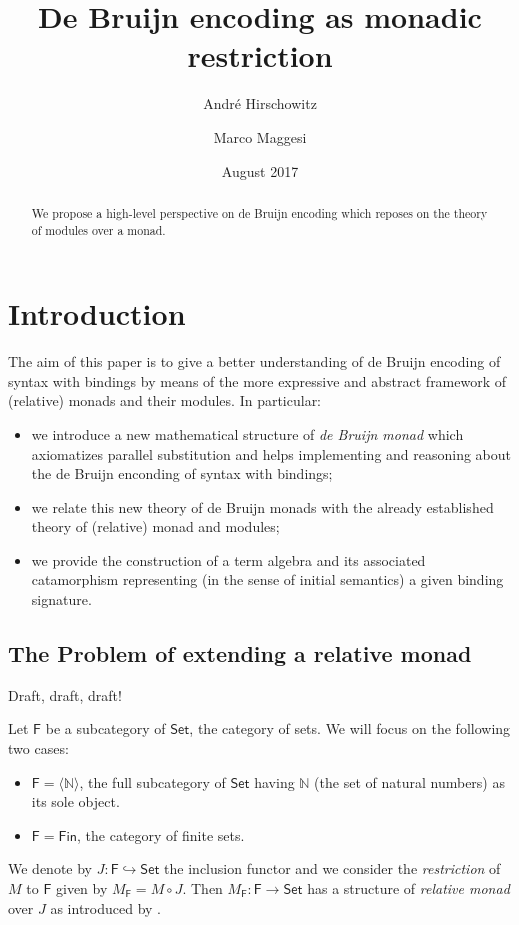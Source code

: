 \documentclass[a4paper,twoside,12pt,draft]{article}
\title{De Bruijn encoding as monadic restriction}
\author{Andr\'e Hirschowitz \and Marco Maggesi}
\date{August 2017}
\theoremstyle{definition}
\theoremstyle{remark}
\newcommand{\Category}[1]{\mathsf{#1}}
\newcommand{\FCat}{\Category{F}}
\newcommand{\SetCat}{\Category{Set}}
\newcommand{\FinCat}{\Category{Fin}}
\newcommand{\NN}{\mathbb{N}}
\begin{document}
\maketitle

\begin{abstract}
  We propose a high-level perspective on de Bruijn encoding
  which reposes on the theory of modules over a monad.
\end{abstract}

\tableofcontents{}

\section{Introduction}
\label{sec:intro}

The aim of this paper is to give a better understanding of de Bruijn
encoding of syntax with bindings by means of the more expressive and
abstract framework of (relative) monads and their modules.  In
particular:
\begin{itemize}
\item we introduce a new mathematical structure of \emph{de Bruijn
    monad} which axiomatizes parallel substitution and helps
  implementing and reasoning about the de Bruijn enconding of syntax
  with bindings;
\item we relate this new theory of de Bruijn monads with the already
  established theory of (relative) monad and modules;
\item we provide the construction of a term algebra and its associated
  catamorphism representing (in the sense of initial semantics) a
  given binding signature.
\end{itemize}

\subsection{The Problem of extending a relative monad}

Draft, draft, draft!

Let $\FCat$ be a subcategory of $\SetCat$, the category of sets.  We
will focus on the following two cases:
\begin{itemize}
\item $\FCat=\langle \NN \rangle$, the full subcategory of $\SetCat$
  having $\NN$ (the set of natural numbers) as its sole object.
\item $\FCat=\FinCat$, the category of finite sets.
\end{itemize}
We denote by $J\colon \FCat \hookrightarrow \SetCat$ the inclusion
functor and we consider the \emph{restriction} of $M$ to $\FCat$ given
by $M_\FCat = M \circ J$.  Then
$M_\FCat : \FCat \longrightarrow \SetCat$ has a structure of
\emph{relative monad} over $J$ as introduced by
\citet*{altenkirch_monads_2010}.
\end{document}
